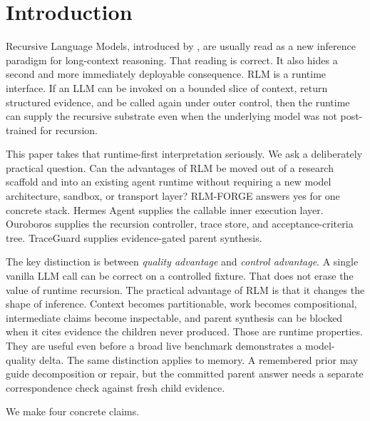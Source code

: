 \documentclass[11pt,a4paper]{article}
\begin{document}
\section{Introduction}
\label{sec:intro}

Recursive Language Models, introduced by \citet{zhang2025rlm}, are usually
read as a new inference paradigm for long-context reasoning. That reading is
correct. It also hides a second and more immediately deployable consequence.
RLM is a runtime interface. If an LLM can be invoked on a bounded slice
of context, return structured evidence, and be called again under outer
control, then the runtime can supply the recursive substrate even when the
underlying model was not post-trained for recursion.

This paper takes that runtime-first interpretation seriously. We ask a
deliberately practical question. Can the advantages of RLM be moved out of a
research scaffold and into an existing agent runtime without requiring a new
model architecture, sandbox, or transport layer? RLM-FORGE answers yes for one
concrete stack. Hermes Agent supplies the callable inner execution layer.
Ouroboros supplies the recursion controller, trace store, and
acceptance-criteria tree. TraceGuard supplies evidence-gated parent synthesis.

The key distinction is between \emph{quality advantage} and \emph{control
advantage}. A single vanilla LLM call can be correct on a controlled fixture.
That does not erase the value of runtime recursion. The practical advantage
of RLM is that it changes the shape of inference. Context becomes
partitionable, work becomes compositional, intermediate claims become
inspectable, and parent synthesis can be blocked when it cites evidence the
children never produced. Those are runtime properties. They are useful even
before a broad live benchmark demonstrates a model-quality delta.
The same distinction applies to memory. A remembered prior may guide
decomposition or repair, but the committed parent answer needs a separate
correspondence check against fresh child evidence.

We make four concrete claims.
\end{document}
